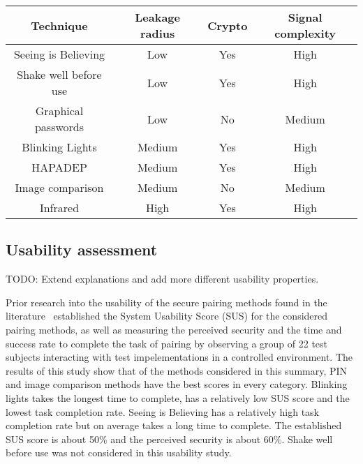 \documentclass[conference, 11pt]{sty/IEEEtran}
\begin{document}
\begin{footnotesize}
\begin{tabular}{c|c|c|c}
	Technique & Leakage radius & Crypto & Signal complexity \\
	\hline
	  Seeing is Believing & Low & Yes & High \\
	Shake well before use & Low & Yes & High \\
    	  Graphical passwords & Low & No & Medium \\
  Blinking Lights & Medium & Yes & High \\
	 HAPADEP & Medium & Yes & High \\
	Image comparison & Medium & No & Medium\\
	Infrared & High & Yes & High \\
\end{tabular}
\end{footnotesize}


\subsection{Usability assessment}
\label{ssec:usability_assessment}

TODO: Extend explanations and add more different usability properties.

Prior research into the usability of the secure pairing methods found in the literature~\cite{kumar2009comparative} established the System Usability Score (SUS) for the considered pairing methods, as well as measuring the perceived security and the time and success rate to complete the task of pairing by observing a group of 22 test subjects interacting with test impelementations in a controlled environment.
The results of this study show that of the methods considered in this summary, PIN and image comparison methods have the best scores in every category.
Blinking lights takes the longest time to complete, has a relatively low SUS score and the lowest task completion rate.
Seeing is Believing has a relatively high task completion rate but on average takes a long time to complete.
The established SUS score is about 50\% and the perceived security is about 60\%.
Shake well before use was not considered in this usability study.
\end{document}
